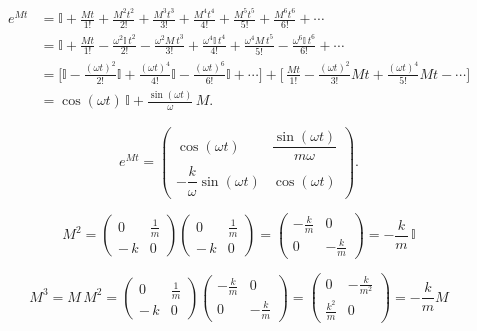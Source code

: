 \documentclass{article}
\begin{document}
\[
\begin{aligned}
e^{Mt}
&=\mathbb{I}+\frac{Mt}{1!}+\frac{M^2t^2}{2!}+\frac{M^3t^3}{3!}
+\frac{M^4t^4}{4!}+\frac{M^5t^5}{5!}+\frac{M^6t^6}{6!}+\cdots\\[4pt]
&=\mathbb{I}
+\frac{Mt}{1!}
-\frac{\omega^2\mathbb{I}\,t^2}{2!}
-\frac{\omega^2 M\,t^3}{3!}
+\frac{\omega^4\mathbb{I}\,t^4}{4!}
+\frac{\omega^4 M\,t^5}{5!}
-\frac{\omega^6\mathbb{I}\,t^6}{6!}
+\cdots\\[6pt]
&=\Bigg[\mathbb{I}-\frac{(\omega t)^2}{2!}\mathbb{I}
+\frac{(\omega t)^4}{4!}\mathbb{I}
-\frac{(\omega t)^6}{6!}\mathbb{I}+\cdots\Bigg]
+\Bigg[\,\frac{Mt}{1!}-\frac{(\omega t)^2}{3!}Mt
+\frac{(\omega t)^4}{5!}Mt-\cdots\Bigg]\\[6pt]
&=\cos(\omega t)\,\mathbb{I}+\frac{\sin(\omega t)}{\omega}\,M.
\end{aligned}
\]

\[
e^{Mt}=
\begin{pmatrix}
\cos(\omega t) & \dfrac{\sin(\omega t)}{m\omega}\\[8pt]
-\dfrac{k}{\omega}\sin(\omega t) & \cos(\omega t)
\end{pmatrix}.
\]

\[
M^{2} = 
\left(
\begin{array}{cc}
0 & \tfrac{1}{m}\\[2pt]
-\,k & 0
\end{array}
\right)
\left(
\begin{array}{cc}
0 & \tfrac{1}{m}\\[2pt]
-\,k & 0
\end{array}
\right)
=
\left(
\begin{array}{cc}
-\tfrac{k}{m} & 0\\[2pt]
0 & -\tfrac{k}{m}
\end{array}
\right)
= -\frac{k}{m}\,\mathbb{I}
\]

\[
M^{3} = M\,M^{2}
=
\left(
\begin{array}{cc}
0 & \tfrac{1}{m}\\[2pt]
-\,k & 0
\end{array}
\right)
\left(
\begin{array}{cc}
-\tfrac{k}{m} & 0\\[2pt]
0 & -\tfrac{k}{m}
\end{array}
\right)
=
\left(
\begin{array}{cc}
0 & -\tfrac{k}{m^{2}}\\[2pt]
\tfrac{k^{2}}{m} & 0
\end{array}
\right)
= -\frac{k}{m}M
\]
\end{document}
